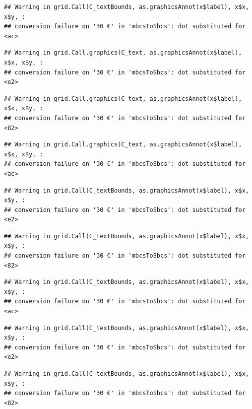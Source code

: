 \documentclass[
]{article}
\begin{document}
\begin{verbatim}
## Warning in grid.Call(C_textBounds, as.graphicsAnnot(x$label), x$x, x$y, :
## conversion failure on '30 €' in 'mbcsToSbcs': dot substituted for <ac>
\end{verbatim}

\begin{verbatim}
## Warning in grid.Call.graphics(C_text, as.graphicsAnnot(x$label), x$x, x$y, :
## conversion failure on '30 €' in 'mbcsToSbcs': dot substituted for <e2>
\end{verbatim}

\begin{verbatim}
## Warning in grid.Call.graphics(C_text, as.graphicsAnnot(x$label), x$x, x$y, :
## conversion failure on '30 €' in 'mbcsToSbcs': dot substituted for <82>
\end{verbatim}

\begin{verbatim}
## Warning in grid.Call.graphics(C_text, as.graphicsAnnot(x$label), x$x, x$y, :
## conversion failure on '30 €' in 'mbcsToSbcs': dot substituted for <ac>
\end{verbatim}

\begin{verbatim}
## Warning in grid.Call(C_textBounds, as.graphicsAnnot(x$label), x$x, x$y, :
## conversion failure on '30 €' in 'mbcsToSbcs': dot substituted for <e2>
\end{verbatim}

\begin{verbatim}
## Warning in grid.Call(C_textBounds, as.graphicsAnnot(x$label), x$x, x$y, :
## conversion failure on '30 €' in 'mbcsToSbcs': dot substituted for <82>
\end{verbatim}

\begin{verbatim}
## Warning in grid.Call(C_textBounds, as.graphicsAnnot(x$label), x$x, x$y, :
## conversion failure on '30 €' in 'mbcsToSbcs': dot substituted for <ac>
\end{verbatim}

\begin{verbatim}
## Warning in grid.Call(C_textBounds, as.graphicsAnnot(x$label), x$x, x$y, :
## conversion failure on '30 €' in 'mbcsToSbcs': dot substituted for <e2>
\end{verbatim}

\begin{verbatim}
## Warning in grid.Call(C_textBounds, as.graphicsAnnot(x$label), x$x, x$y, :
## conversion failure on '30 €' in 'mbcsToSbcs': dot substituted for <82>
\end{verbatim}
\end{document}
